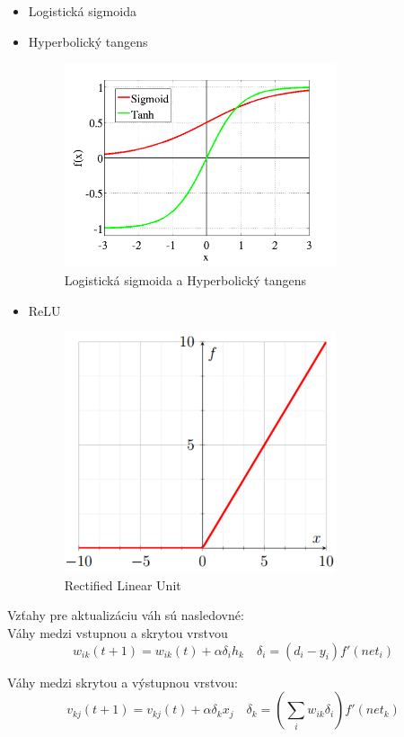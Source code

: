 \begin{itemize}
	\item Logistická sigmoida
	\item Hyperbolický tangens
	
	\begin{figure}[H]
		\centering
		\includegraphics[width=8cm]{assets/activation_functions}
		\caption{Logistická sigmoida a Hyperbolický tangens}
	\end{figure}
	\item ReLU
	\begin{figure}[H]
		\centering
		\includegraphics[width=8cm]{assets/relu}
		\caption{Rectified Linear Unit}
	\end{figure}
\end{itemize}

Vzťahy pre aktualizáciu váh sú nasledovné: \\

Váhy medzi vstupnou a skrytou vrstvou
\begin{equation}
	w_{ik}(t+1) = w_{ik}(t) + \alpha\delta_{i}h_{k} \quad \delta_{i} = (d_i - y_i)f'(net_{i})
\end{equation}

Váhy medzi skrytou a výstupnou vrstvou: 
\begin{equation}
	v_{kj}(t+1) = v_{kj}(t) + \alpha\delta_{k}x_{j} \quad \delta_{k} = (\sum_{i} w_{ik}\delta_{i})f'(net_{k})
\end{equation}

